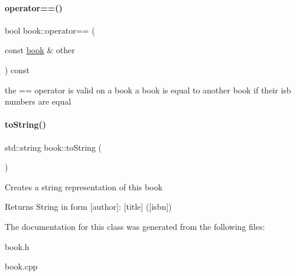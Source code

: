\paragraph{\texorpdfstring{operator==()}{operator==()}}
{\footnotesize\ttfamily bool book\+::operator== (\begin{DoxyParamCaption}\item[{const \hyperlink{classbook}{book} \&}]{other }\end{DoxyParamCaption}) const\hspace{0.3cm}{\ttfamily [inline]}}

the == operator is valid on a book a book is equal to another book if their isb numbers are equal \mbox{\label{classbook_ac673df10b3812cf593f02a7c9967a947}} 
\paragraph{\texorpdfstring{to\+String()}{toString()}}
{\footnotesize\ttfamily std\+::string book\+::to\+String (\begin{DoxyParamCaption}{ }\end{DoxyParamCaption})}

Creates a string representation of this book

\begin{DoxyReturn}{Returns}
String in form \mbox{[}author\mbox{]}\+: \mbox{[}title\mbox{]} (\mbox{[}isbn\mbox{]}) 
\end{DoxyReturn}


The documentation for this class was generated from the following files\+:\begin{DoxyCompactItemize}
\item 
book.\+h\item 
book.\+cpp\end{DoxyCompactItemize}
